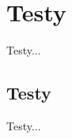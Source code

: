 \documentclass[praca_magisterska]{subfiles}
\begin{document}
\chapter{Testy}

Testy...

\section{Testy}

Testy...
\end{document}
